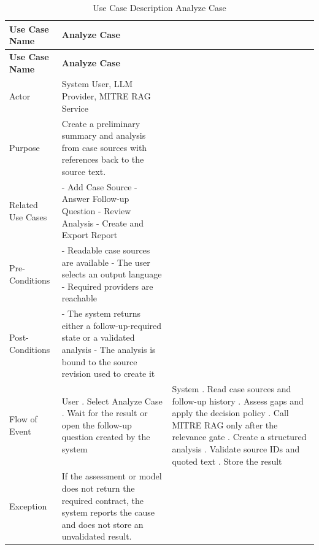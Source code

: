 \begin{longtable}{@{}>{\raggedright\arraybackslash}p{} >{\raggedright\arraybackslash}p{} >{\raggedright\arraybackslash}p{}@{}}
\caption{Use Case Description Analyze Case}\label{tab:3-4}\\
\toprule
\textbf{Use Case Name} & \textbf{Analyze Case} & \textbf{} \\
\midrule
\endfirsthead
\textbf{Use Case Name} & \textbf{Analyze Case} & \textbf{} \\
\midrule
\endhead
Actor & System User, LLM Provider, MITRE RAG Service &  \\
Purpose & Create a preliminary summary and analysis from case sources with references back to the source text. &  \\
Related Use Cases & - Add Case Source \newline - Answer Follow-up Question \newline - Review Analysis \newline - Create and Export Report &  \\
Pre-Conditions & - Readable case sources are available \newline - The user selects an output language \newline - Required providers are reachable &  \\
Post-Conditions & - The system returns either a follow-up-required state or a validated analysis \newline - The analysis is bound to the source revision used to create it &  \\
Flow of Event & User \newline 1. Select Analyze Case \newline 2. Wait for the result or open the follow-up question created by the system & System \newline 1. Read case sources and follow-up history \newline 2. Assess gaps and apply the decision policy \newline 3. Call MITRE RAG only after the relevance gate \newline 4. Create a structured analysis \newline 5. Validate source IDs and quoted text \newline 6. Store the result \\
Exception & If the assessment or model does not return the required contract, the system reports the cause and does not store an unvalidated result. &  \\
\bottomrule
\end{longtable}


